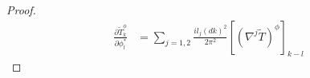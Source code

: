 \documentclass[noinfoline]{imsart}
\begin{document}
\begin{proof}
\begin{align}
\frac{\partial \widetilde T^\phi_k }{\partial \phi^*_{ l} } 
 &=\sum_{j=1,2}\frac{ il_j (dk)^2}{2\pi^2} [(\nabla^j\widetilde T)^\phi]_{k-l}
\end{align}
\end{proof}
\end{document}
